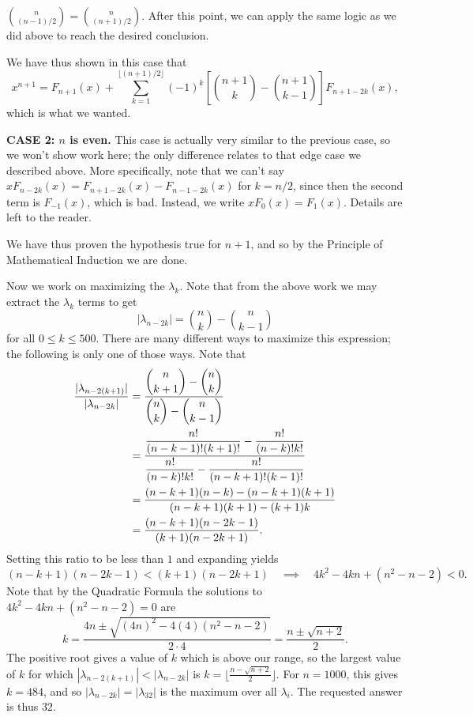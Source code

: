 \documentclass[10pt]{article}
\begin{document}
\begin{enumerate}
\begin{itemize}
$\binom{n}{(n-1)/2}=\binom{n}{(n+1)/2}$.  After this point, we can apply the same logic as we did above to reach the desired conclusion.

\par We have thus shown in this case that \[x^{n+1}=F_{n+1}(x)+\sum_{k=1}^{\lfloor (n+1)/2\rfloor}(-1)^k\left[\binom {n+1}k-\binom {n+1}{k-1}\right]F_{n+1-2k}(x),\] which is what we wanted.

\textbf{CASE 2: $n$ is even.}  This case is actually very similar to the previous case, so we won't show work here; the only difference relates to that edge case we described above.  More specifically, note that we can't say $xF_{n-2k}(x)=F_{n+1-2k}(x)-F_{n-1-2k}(x)$ for $k=n/2$, since then the second term is $F_{-1}(x)$, which is bad.  Instead, we write $xF_0(x)=F_1(x)$. Details are left to the reader.
\end{itemize}

\par We have thus proven the hypothesis true for $n+1$, and so by the Principle of Mathematical Induction we are done. 

\par Now we work on maximizing the $\lambda_k$.  Note that from the above work we may extract the $\lambda_k$ terms to get \[|\lambda_{n-2k}|=\binom nk-\binom n{k-1}\] for all $0\leq k\leq 500$.  There are many different ways to maximize this expression; the following is only one of those ways.  Note that \begin{align*}\dfrac{|\lambda_{n-2(k+1)}|}{|\lambda_{n-2k}|}&=\dfrac{\dbinom{n}{k+1}-\dbinom{n}k}{\dbinom{n}k-\dbinom{n}{k-1}}\\&=\dfrac{\dfrac{n!}{(n-k-1)!(k+1)!}-\dfrac{n!}{(n-k)!k!}}{\dfrac{n!}{(n-k)!k!}-\dfrac{n!}{(n-k+1)!(k-1)!}}\\&=\dfrac{(n-k+1)(n-k)-(n-k+1)(k+1)}{(n-k+1)(k+1)-(k+1)k}\\&=\dfrac{(n-k+1)(n-2k-1)}{(k+1)(n-2k+1)}.\end{align*} Setting this ratio to be less than $1$ and expanding yields \[(n-k+1)(n-2k-1)<(k+1)(n-2k+1)\quad\implies\quad 4k^2-4kn+(n^2-n-2)<0.\] Note that by the Quadratic Formula the solutions to $4k^2-4kn+(n^2-n-2)=0$ are \[k=\dfrac{4n\pm\sqrt{(4n)^2-4(4)(n^2-n-2)}}{2\cdot 4}=\dfrac{n\pm\sqrt{n+2}}2.\] The positive root gives a value of $k$ which is above our range, so the largest value of $k$ for which $|\lambda_{n-2(k+1)}|<|\lambda_{n-2k}|$ is $k=\lfloor\tfrac{n-\sqrt{n+2}}2\rfloor$.  For $n=1000$, this gives $k=484$, and so $|\lambda_{n-2k}|=|\lambda_{32}|$ is the maximum over all $\lambda_i$.  The requested answer is thus $\boxed{32}$.

\end{enumerate}
\end{document}
